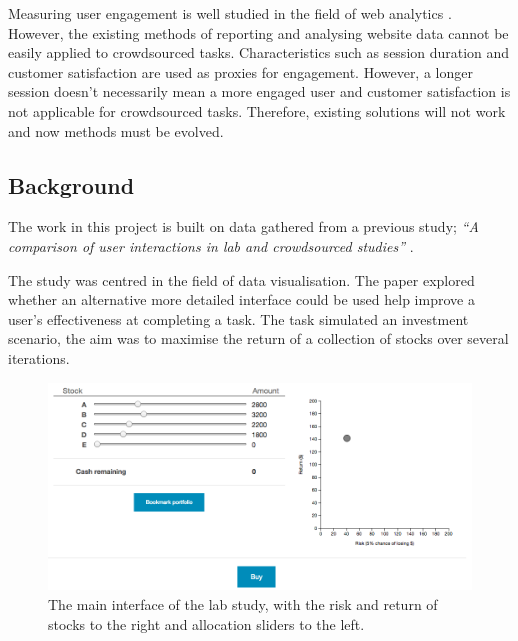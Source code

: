\documentclass{article}
\begin{document}
Measuring user engagement is well studied in the field of web analytics \cite{peterson2008measuring}.
However, the existing methods of reporting and analysing website data cannot be easily applied to crowdsourced tasks.    
Characteristics such as session duration and customer satisfaction are used as proxies for engagement.
However, a longer session doesn't necessarily mean a more engaged user and customer satisfaction is not applicable for crowdsourced tasks.
Therefore, existing solutions will not work and now methods must be evolved.


\subsection{Background}


The work in this project is built on data gathered from a previous study;
\textit{``A comparison of user interactions in lab and crowdsourced
studies''} \cite{gruber2017thesis}.

The study was centred in the field of data visualisation.
The paper explored whether an alternative more detailed interface could be used help improve a user's effectiveness at completing a task.
The task simulated an investment scenario, the aim was to maximise the return of a collection of stocks over several iterations. 

\begin{figure}[ht]
    \centering
    \includegraphics[scale=0.35, frame]{Images/interface.png}
    \caption{The main interface of the lab study, with the risk and return of stocks to the right and allocation sliders to the left.}
    \label{fig:interface}
\end{figure}
\end{document}
